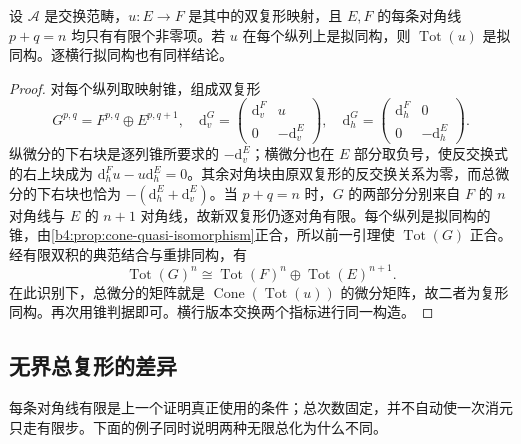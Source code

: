 \begin{corollary}\label{b4:cor:double-complex-comparison}
	设 \(\mathcal A\) 是交换范畴，\(u:E\to F\) 是其中的双复形映射，且 \(E,F\) 的每条对角线 \(p+q=n\) 均只有有限个非零项。若 \(u\) 在每个纵列上是拟同构，则 \(\operatorname{Tot}(u)\) 是拟同构。逐横行拟同构也有同样结论。
\end{corollary}
\begin{proof}
	对每个纵列取映射锥，组成双复形
	\[
		G^{p,q}=F^{p,q}\oplus E^{p,q+1},\quad
		\mathrm{d}_v^G=\begin{pmatrix}\mathrm{d}_v^F&u\\0&-\mathrm{d}_v^E\end{pmatrix},\quad
		\mathrm{d}_h^G=\begin{pmatrix}\mathrm{d}_h^F&0\\0&-\mathrm{d}_h^E\end{pmatrix}.
	\]
	纵微分的下右块是逐列锥所要求的 \(-\mathrm{d}_v^E\)；横微分也在 \(E\) 部分取负号，使反交换式的右上块成为 \(\mathrm{d}_h^Fu-u\mathrm{d}_h^E=0\)。其余对角块由原双复形的反交换关系为零，而总微分的下右块也恰为 \(-(\mathrm{d}_h^E+\mathrm{d}_v^E)\)。当 \(p+q=n\) 时，\(G\) 的两部分分别来自 \(F\) 的 \(n\) 对角线与 \(E\) 的 \(n+1\) 对角线，故新双复形仍逐对角有限。每个纵列是拟同构的锥，由\cref{b4:prop:cone-quasi-isomorphism}正合，所以前一引理使 \(\operatorname{Tot}(G)\) 正合。经有限双积的典范结合与重排同构，有
	\[
		\operatorname{Tot}(G)^n\cong \operatorname{Tot}(F)^n\oplus\operatorname{Tot}(E)^{n+1}.
	\]
	在此识别下，总微分的矩阵就是 \(\operatorname{Cone}(\operatorname{Tot}(u))\) 的微分矩阵，故二者为复形同构。再次用锥判据即可。横行版本交换两个指标进行同一构造。
\end{proof}

\subsection{无界总复形的差异}
\label{b4:subsec:0604:03}

每条对角线有限是上一个证明真正使用的条件；总次数固定，并不自动使一次消元只走有限步。下面的例子同时说明两种无限总化为什么不同。


